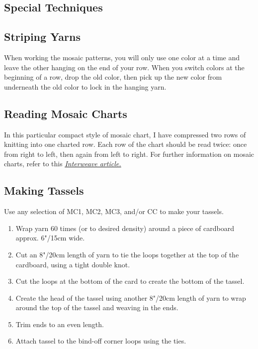 \documentclass[12pt]{article}
\begin{document}
\begin{multicols}{2}
\section*{Special Techniques}


\subsection*{Striping Yarns}

When working the mosaic patterns, you will only use one color at a time and leave the other hanging on the end of your row. When you switch colors at the beginning of a row, drop the old color, then pick up the new color from underneath the old color to lock in the hanging yarn.

\subsection*{Reading Mosaic Charts}

In this particular compact style of mosaic chart, I have compressed two rows of knitting into one charted row. Each row of the chart should be read twice: once from right to left, then again from left to right. For further information on mosaic charts, refer to this \href{https://www.interweave.com/article/knitting/tech-tip-mosaic-knitting/}{\underline{\emph{Interweave article.}}}

\subsection*{Making Tassels}

Use any selection of MC1, MC2, MC3, and/or CC to make your tassels.

\begin{enumerate}
\item Wrap yarn 60 times (or to desired density) around a piece of cardboard approx. 6"/15cm wide.
\item Cut an 8"/20cm length of yarn to tie the loops together at the top of the cardboard, using a tight double knot.
\item Cut the loops at the bottom of the card to create the bottom of the tassel.
\item Create the head of the tassel using another 8"/20cm length of yarn to wrap around the top of the tassel and weaving in the ends.
\item Trim ends to an even length.
\item Attach tassel to the bind-off corner loops using the ties.
\end{enumerate}


\end{multicols}
\end{document}

